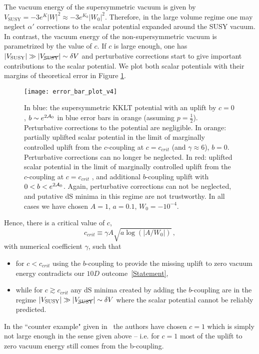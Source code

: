\documentclass[aps,prd,amsmath,amsfonts,a4paper,11pt,reprint,twocolumn,square,numbers,showpacs,superscriptaddress,floatfix,sort&compress,nofootinbib]{revtex4-1}
\begin{document}
The vacuum energy of the supersymmetric vacuum is given by $V_{\text{SUSY}}=-3e^{K}|W|^2\approx -3e^{K_0}|W_0|^2$. Therefore, in the large volume regime one may neglect $\alpha'$ corrections to the scalar potential expanded around the SUSY vacuum. In contrast, the vacuum energy of the non-supersymmetric vacuum is parametrized by the value of $c$. If $c$ is large enough, one has $|V_{\text{SUSY}}|\gg |V_{\cancel{\text{SUSY}}}|\sim \delta V$ and perturbative corrections start to give important contributions to the scalar potential. We plot both scalar potentials with their margins of theoretical error in Figure \ref{fig:errorbars}.
\begin{figure}[t!]
	\begin{center}
		\texttt{[image: error\_bar\_plot\_v4]}
	\end{center}\vspace*{-0.5cm}
	\caption{In blue: the supersymmetric KKLT potential with an uplift by $c=0$, $b\sim e^{2{\cal A}_0}$ in blue error bars in orange (assuming $p=\frac{1}{2}$). Perturbative corrections to the potential are negligible. In orange: partially uplifted scalar potential in the limit of marginally controlled uplift from the $c$-coupling at $c= c_{crit}$ (and $\gamma\approx 6$), $b=0$. Perturbative corrections can no longer be neglected. In red: uplifted scalar potential in the limit of marginally controlled uplift from the $c$-coupling at $c=c_{crit}$ , and additional $b$-coupling uplift with $0<b<e^{2{\cal A}_0}$. Again, perturbative corrections can not be neglected, and putative dS minima in this regime are not trustworthy. In all cases we have chosen $A=1$, $a=0.1$, $W_0=-10^{-4}$.}
	\label{fig:errorbars}
\end{figure}

Hence, there is a critical value of $c$,
\begin{equation}\label{eq:UpliftControlLimit1}
c_{crit}\equiv  \gamma A \sqrt{a\log(|A/W_0|)}\, ,
\end{equation}
with numerical coefficient $\gamma$, such that
\begin{itemize}
\item for $c<c_{crit}$ using the $b$-coupling to provide the missing uplift to zero vacuum energy contradicts our $10D$ outcome~\eqref{Statement},
\item while for $c\gtrsim c_{crit}$ any dS minima created by adding the $b$-coupling are in the regime $|V_{\text{SUSY}}|\gg |V_{\cancel{\text{SUSY}}}|\sim \delta V$ where the scalar potential cannot be reliably predicted.
\end{itemize}
In the ``counter example" given in~\cite{Kallosh:2018wme} the authors have chosen $c=1$ which is simply not large enough in the sense given above -- i.e. for $c=1$ most of the uplift to zero vacuum energy still comes from the b-coupling.
\end{document}
